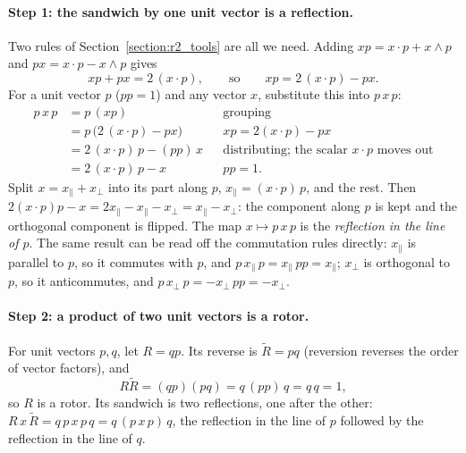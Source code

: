 \paragraph{Step 1: the sandwich by one unit vector is a reflection.} Two rules of Section~\ref{section:r2_tools} are all we need. Adding $xp = x\cdot p + x\wedge p$ and $px = x\cdot p - x\wedge p$ gives
\begin{equation*}
x p + p x = 2\, (x\cdot p), \qquad\text{so}\qquad x p = 2\,(x\cdot p) - p x .
\end{equation*}
For a unit vector $p$ ($pp = 1$) and any vector $x$, substitute this into $p\,x\,p$:
\begin{align*}
p\, x\, p &= p\,(x p) && \text{grouping} \\
&= p\,\big(2\,(x\cdot p) - p x\big) && x p = 2(x\cdot p) - p x \\
&= 2\,(x\cdot p)\, p - (p p)\, x && \text{distributing; the scalar } x\cdot p \text{ moves out} \\
&= 2\,(x\cdot p)\, p - x && p p = 1 .
\end{align*}
Split $x = x_\parallel + x_\perp$ into its part along $p$, $x_\parallel = (x\cdot p)\,p$, and the rest. Then $2(x\cdot p)p - x = 2x_\parallel - x_\parallel - x_\perp = x_\parallel - x_\perp$: the component along $p$ is kept and the orthogonal component is flipped. The map $x\mapsto p\,x\,p$ is the \emph{reflection in the line of $p$}. The same result can be read off the commutation rules directly: $x_\parallel$ is parallel to $p$, so it commutes with $p$, and $p\,x_\parallel\,p = x_\parallel\,pp = x_\parallel$; $x_\perp$ is orthogonal to $p$, so it anticommutes, and $p\,x_\perp\,p = -x_\perp\,pp = -x_\perp$.

\paragraph{Step 2: a product of two unit vectors is a rotor.} For unit vectors $p, q$, let $R = qp$. Its reverse is $\widetilde R = pq$ (reversion reverses the order of vector factors), and
\begin{equation*}
R\widetilde R = (q p)(p q) = q\,(p p)\, q = q\, q = 1 ,
\end{equation*}
so $R$ is a rotor. Its sandwich is two reflections, one after the other: $R\,x\,\widetilde R = q\,p\,x\,p\,q = q\,(p\,x\,p)\,q$, the reflection in the line of $p$ followed by the reflection in the line of $q$.

